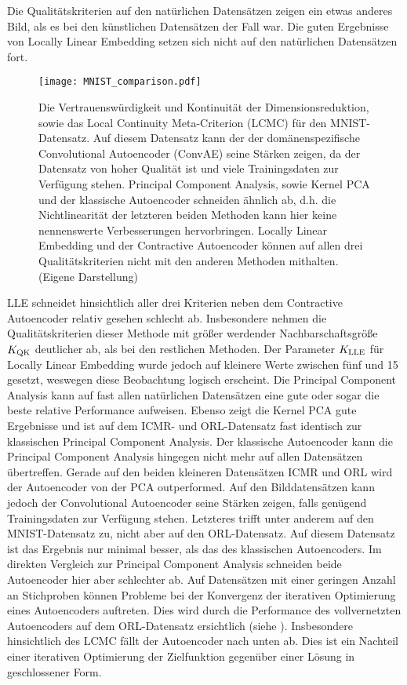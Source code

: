 Die Qualitätskriterien auf den natürlichen Datensätzen zeigen ein etwas anderes Bild, als es bei
den künstlichen Datensätzen der Fall war. Die guten Ergebnisse von Locally Linear Embedding setzen
sich nicht auf den natürlichen Datensätzen fort.
\begin{figure}[ht]
	\begin{center}
		\texttt{[image: MNIST\_comparison.pdf]}
	\end{center}
	\caption[Qualitätskriterien für den MNIST-Datensatz]{Die Vertrauenswürdigkeit und Kontinuität der Dimensionsreduktion, sowie das Local Continuity Meta-Criterion (LCMC) für den MNIST-Datensatz. Auf diesem Datensatz kann der der domänenspezifische Convolutional Autoencoder (ConvAE) seine Stärken zeigen, da der Datensatz von hoher Qualität ist und viele Trainingsdaten zur Verfügung stehen. Principal Component Analysis, sowie Kernel PCA und der klassische Autoencoder schneiden ähnlich ab, d.h. die Nichtlinearität der letzteren beiden Methoden kann hier keine nennenswerte Verbesserungen hervorbringen. Locally Linear Embedding und der Contractive Autoencoder können auf allen drei Qualitätskriterien nicht mit den anderen Methoden mithalten. (Eigene Darstellung)}
	\label{fig:MNISTMetrics}
\end{figure}
LLE schneidet hinsichtlich aller drei Kriterien neben dem Contractive Autoencoder relativ gesehen schlecht ab. Insbesondere nehmen die
Qualitätskriterien dieser Methode mit größer werdender Nachbarschaftsgröße $K_{\text{QK}}$ deutlicher ab, als bei den
restlichen Methoden. Der Parameter $K_{\text{LLE}}$ für Locally Linear Embedding wurde jedoch auf kleinere Werte zwischen fünf und 15 gesetzt, weswegen diese Beobachtung logisch erscheint. Die Principal Component Analysis kann auf fast allen natürlichen Datensätzen eine gute oder sogar die
beste relative Performance aufweisen. Ebenso zeigt die Kernel PCA gute Ergebnisse und ist auf dem ICMR- und ORL-Datensatz fast identisch zur klassischen Principal Component Analysis. Der klassische Autoencoder kann die Principal Component Analysis hingegen nicht mehr auf allen Datensätzen übertreffen. Gerade auf den beiden kleineren Datensätzen ICMR und ORL wird der Autoencoder von der PCA outperformed. Auf den Bilddatensätzen kann jedoch der Convolutional
Autoencoder seine Stärken zeigen, falls genügend Trainingsdaten zur Verfügung stehen. Letzteres trifft unter anderem auf den MNIST-Datensatz zu, nicht aber auf den ORL-Datensatz. Auf diesem Datensatz ist das Ergebnis nur minimal besser, als das des klassischen Autoencoders. Im direkten Vergleich zur Principal Component Analysis schneiden beide Autoencoder hier aber schlechter ab.
Auf Datensätzen mit einer geringen Anzahl an Stichproben können Probleme bei der Konvergenz der iterativen Optimierung eines Autoencoders auftreten. Dies wird durch die Performance des vollvernetzten Autoencoders auf dem ORL-Datensatz ersichtlich (siehe ). Insbesondere hinsichtlich des LCMC fällt der Autoencoder nach unten ab. Dies ist ein Nachteil einer iterativen Optimierung der Zielfunktion gegenüber einer Lösung in geschlossener Form.

